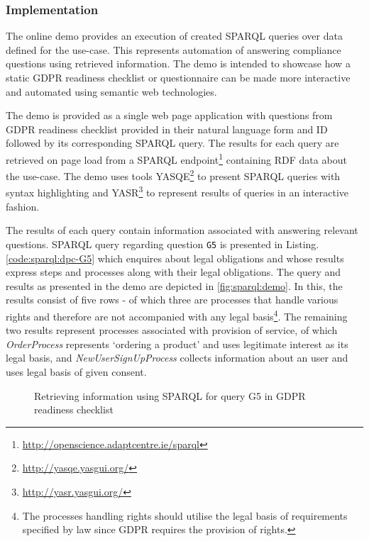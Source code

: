 \subsubsection{Implementation}
The online demo provides an execution of created SPARQL queries over data defined for the use-case.
This represents automation of answering compliance questions using retrieved information.
The demo is intended to showcase how a static GDPR readiness checklist or questionnaire can be made more interactive and automated using semantic web technologies.

The demo is provided as a single web page application with questions from GDPR readiness checklist provided in their natural language form and ID followed by its corresponding SPARQL query.
The results for each query are retrieved on page load from a
SPARQL endpoint\footnote{\url{http://openscience.adaptcentre.ie/sparql}}
containing RDF data about the use-case.
The demo uses tools YASQE\footnote{\url{http://yasqe.yasgui.org/}} to present SPARQL queries with syntax highlighting and YASR\footnote{\url{http://yasr.yasgui.org/}} to represent results of queries in an interactive fashion.

The results of each query contain information associated with answering relevant questions. SPARQL query regarding question \texttt{G5} is presented in Listing. \autoref{code:sparql:dpc-G5} which enquires about legal obligations and whose results express steps and processes along with their legal obligations.
The query and results as presented in the demo are depicted in \autoref{fig:sparql:demo}.
In this, the results consist of five rows - of which three are processes that handle various rights and therefore are not accompanied with any legal basis\footnote{The processes handling rights should utilise the legal basis of requirements specified by law since GDPR requires the provision of rights.}.
The remaining two results represent processes associated with provision of service, of which \textit{OrderProcess} represents `ordering a product' and uses legitimate interest as its legal basis, and \textit{NewUserSignUpProcess} collects information about an user and uses legal basis of given consent.
\begin{figure}[htbp]
\centering
{}
\caption{Retrieving information using SPARQL for query G5 in GDPR readiness checklist}
\label{fig:sparql:demo}
\end{figure}

